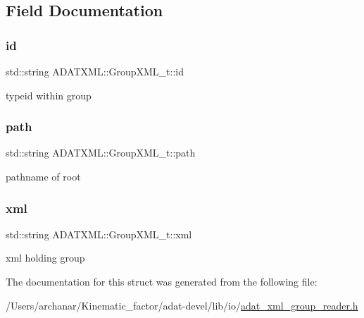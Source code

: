 \subsection{Field Documentation}
\mbox{\label{structADATXML_1_1GroupXML__t_a618530d5beb151a6c2993555d604bd6b}} 
\subsubsection{\texorpdfstring{id}{id}}
{\footnotesize\ttfamily std\+::string A\+D\+A\+T\+X\+M\+L\+::\+Group\+X\+M\+L\+\_\+t\+::id}

typeid within group \mbox{\label{structADATXML_1_1GroupXML__t_a3dcdc0c3e78cfa5f84c28f79407c4ad2}} 
\subsubsection{\texorpdfstring{path}{path}}
{\footnotesize\ttfamily std\+::string A\+D\+A\+T\+X\+M\+L\+::\+Group\+X\+M\+L\+\_\+t\+::path}

pathname of root \mbox{\label{structADATXML_1_1GroupXML__t_aa55c46630f1b4fa95f642c24a46e8323}} 
\subsubsection{\texorpdfstring{xml}{xml}}
{\footnotesize\ttfamily std\+::string A\+D\+A\+T\+X\+M\+L\+::\+Group\+X\+M\+L\+\_\+t\+::xml}

xml holding group 

The documentation for this struct was generated from the following file\+:\begin{DoxyCompactItemize}
\item 
/\+Users/archanar/\+Kinematic\+\_\+factor/adat-\/devel/lib/io/\mbox{\hyperlink{adat-devel_2lib_2io_2adat__xml__group__reader_8h}{adat\+\_\+xml\+\_\+group\+\_\+reader.\+h}}\end{DoxyCompactItemize}
